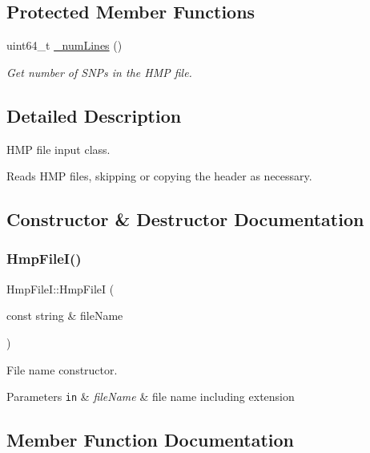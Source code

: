 \subsection*{Protected Member Functions}
\begin{DoxyCompactItemize}
\item 
uint64\+\_\+t \hyperlink{classsamp_files_1_1_hmp_file_i_a2a39e46be7d94f39a4c6250855c1da1c}{\+\_\+num\+Lines} ()
\begin{DoxyCompactList}\small\item\em Get number of S\+N\+Ps in the H\+MP file. \end{DoxyCompactList}\end{DoxyCompactItemize}


\subsection{Detailed Description}
H\+MP file input class. 

Reads H\+MP files, skipping or copying the header as necessary. 

\subsection{Constructor \& Destructor Documentation}
\mbox{\label{classsamp_files_1_1_hmp_file_i_a61a3b829ed54c8c7e6431747a20f4466}} 
\subsubsection{\texorpdfstring{Hmp\+File\+I()}{HmpFileI()}}
{\footnotesize\ttfamily Hmp\+File\+I\+::\+Hmp\+FileI (\begin{DoxyParamCaption}\item[{const string \&}]{file\+Name }\end{DoxyParamCaption})}



File name constructor. 


\begin{DoxyParams}[1]{Parameters}
\mbox{\tt in}  & {\em file\+Name} & file name including extension \\
\hline
\end{DoxyParams}


\subsection{Member Function Documentation}
\mbox{\label{classsamp_files_1_1_hmp_file_i_a2a39e46be7d94f39a4c6250855c1da1c}} 
